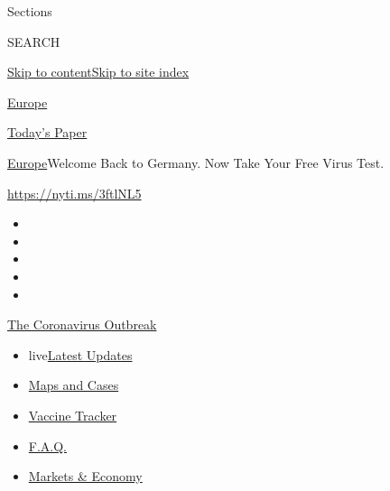 Sections

SEARCH

\protect\hyperlink{site-content}{Skip to
content}\protect\hyperlink{site-index}{Skip to site index}

\href{https://www.nytimes.com/section/world/europe}{Europe}

\href{https://myaccount.nytimes.com/auth/login?response_type=cookie\&client_id=vi}{}

\href{https://www.nytimes.com/section/todayspaper}{Today's Paper}

\href{/section/world/europe}{Europe}\textbar{}Welcome Back to Germany.
Now Take Your Free Virus Test.

\href{https://nyti.ms/3ftlNL5}{https://nyti.ms/3ftlNL5}

\begin{itemize}
\item
\item
\item
\item
\item
\end{itemize}

\href{https://www.nytimes.com/news-event/coronavirus?action=click\&pgtype=Article\&state=default\&region=TOP_BANNER\&context=storylines_menu}{The
Coronavirus Outbreak}

\begin{itemize}
\tightlist
\item
  live\href{https://www.nytimes.com/2020/08/08/world/coronavirus-updates.html?action=click\&pgtype=Article\&state=default\&region=TOP_BANNER\&context=storylines_menu}{Latest
  Updates}
\item
  \href{https://www.nytimes.com/interactive/2020/us/coronavirus-us-cases.html?action=click\&pgtype=Article\&state=default\&region=TOP_BANNER\&context=storylines_menu}{Maps
  and Cases}
\item
  \href{https://www.nytimes.com/interactive/2020/science/coronavirus-vaccine-tracker.html?action=click\&pgtype=Article\&state=default\&region=TOP_BANNER\&context=storylines_menu}{Vaccine
  Tracker}
\item
  \href{https://www.nytimes.com/interactive/2020/world/coronavirus-tips-advice.html?action=click\&pgtype=Article\&state=default\&region=TOP_BANNER\&context=storylines_menu}{F.A.Q.}
\item
  \href{https://www.nytimes.com/live/2020/08/07/business/stock-market-today-coronavirus?action=click\&pgtype=Article\&state=default\&region=TOP_BANNER\&context=storylines_menu}{Markets
  \& Economy}
\end{itemize}

